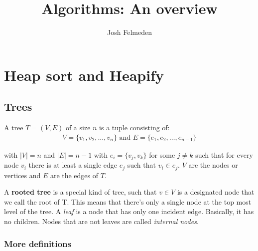 \documentclass[11pt,a4paper,titlepage,dvipsnames,cmyk]{scrartcl}
\title{Algorithms: An overview}
\author{Josh Felmeden}
\begin{document}
\maketitle
\tableofcontents
{}

\newpage
{}

\section{Heap sort and Heapify}%
\label{sec:Heap sort and Heapify}
\subsection{Trees}%
\label{sub:Trees}
\begin{tcolorbox} [space to upper,
        collower=white,
        title={Tree definition},
        nobeforeafter,
        halign lower=flush right, ]
A tree $T = (V, E)$ of a size $n$ is a tuple consisting of:
\begin{align*}
    V = \{v_1,v_2, \dots, v_n \} \text{ and } E = \{e_1, e_2, \dots,
    e_{n-1}\}
\end{align*}

with $|V| = n$ and $|E| = n-1$ with $e_i = \{v_j, v_k\}$ for some $j \not
= k$ such that for every node $v_i$ there is at least a single edge $e_j$
such that $v_i \in e_j$. $V$ are the nodes or vertices and $E$ are the
edges of $T$.

\end{tcolorbox}

A \textbf{rooted tree} is a special kind of tree, such that $v \in V$ is a
designated node that we call the root of T. This means that there's only
a single node at the top most level of the tree. A \textit{leaf} is a node
that has only one incident edge. Basically, it has no children. Nodes that
are not leaves are called \textit{internal nodes}.

\subsubsection{More definitions}%
\label{ssub:More definitions}
\end{document}
